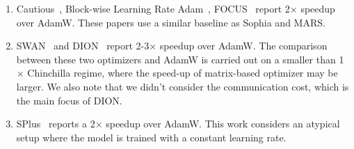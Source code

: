 \begin{enumerate}[leftmargin=*]
    Further, their comparison of Muon and AdamW on the MoE experiments compare two models with not fully decayed learning rate and this may significantly favors Muon, as shown in~.
    It is later shown independently in the work of Essential AI~\cite{ai2025practicalefficiencymuonpretraining} that Muon's token efficiency compared to AdamW is only 1.1 to 1.2$\times$.
    \item Cautious~\cite{liang2025cautious}, Block-wise Learning Rate Adam~\cite{wang2025sharpnessdisparityprincipletransformers}, FOCUS~\cite{liu2025focusorderconcentratedupdating} report 2$\times$ speedup over AdamW. These papers use a similar baseline as Sophia and MARS.
    \item SWAN~\cite{ma2025swansgdnormalizationwhitening} and DION~\cite{ahn2025diondistributedorthonormalizedupdates} report 2-3$\times$ speedup over AdamW. The comparison between these two optimizers and AdamW is carried out on a smaller than 1$\times$ Chinchilla regime, where the speed-up of matrix-based optimizer may be larger. We also note that we didn't consider the communication cost, which is the main focus of DION.
    \item SPlus~\cite{frans2025stablewhiteningoptimizerefficient} reports a 2$\times$ speedup over AdamW. This work considers an atypical setup where the model is trained with a constant learning rate.
\end{enumerate}
